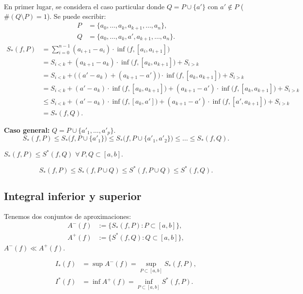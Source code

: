\documentclass[11pt,a4paper]{article}
\begin{document}
\begin{demo}
En primer lugar, se considera el caso particular donde $Q=P\cup\{a'\}$ con $a'\notin P$ ($\#(Q\setminus P)=1$). Se puede escribir:
\begin{align*}
  P&=\{a_0,\dots,a_k,a_{k+1},\dots,a_n\},\\
  Q&=\{a_0,\dots,a_k,a',a_{k+1},\dots,a_n\}.
\end{align*}
\begin{align*}
  S_*(f,P) &= \sum_{i=0}^{n-1}(a_{i+1}-a_i)\cdot\inf\bigl(f,[a_i,a_{i+1}]\bigr)\\
  &= S_{i<k} + (a_{k+1}-a_k)\cdot\inf\bigl(f,[a_k,a_{k+1}]\bigr) + S_{i>k}\\
  &= S_{i<k} + \bigl((a'-a_k)+(a_{k+1}-a')\bigr)\cdot\inf\bigl(f,[a_k,a_{k+1}]\bigr) + S_{i>k}\\
  &= S_{i<k} + (a'-a_k)\cdot\inf\bigl(f,[a_k,a_{k+1}]\bigr) + (a_{k+1}-a')\cdot\inf\bigl(f,[a_k,a_{k+1}]\bigr) + S_{i>k}\\
  &\le S_{i<k} + (a'-a_k)\cdot\inf\bigl(f,[a_k,a']\bigr) + (a_{k+1}-a')\cdot\inf\bigl(f,[a',a_{k+1}]\bigr) + S_{i>k}\\
  &= S_*(f,Q).
\end{align*}

\textbf{Caso general:} $Q=P\cup\{a'_1,\dots,a'_p\}$.
\[
  S_*(f,P)\le S_*\bigl(f,P\cup\{a'_1\}\bigr)\le S_*\bigl(f,P\cup\{a'_1,a'_2\}\bigr)\le\dots\le S_*(f,Q).
\]
\end{demo}

\begin{proposicion}
$S_*(f,P)\le S^*(f,Q)$ \quad $\forall\,P,Q\subset[a,b]$.
\end{proposicion}

\begin{demo}
\[
  S_*(f,P)\le S_*(f,P\cup Q)\le S^*(f,P\cup Q)\le S^*(f,Q).
\]
\end{demo}

\subsection{Integral inferior y superior}

Tenemos dos conjuntos de aproximaciones:
\begin{align*}
  A^-(f) &:= \{S_*(f,P) : P\subset[a,b]\},\\
  A^+(f) &:= \{S^*(f,Q) : Q\subset[a,b]\},
\end{align*}
\qquad $A^-(f)\ll A^+(f)$.

\begin{definicion}
\begin{align*}
  I_*(f) &= \sup A^-(f) = \sup_{P\subset[a,b]} S_*(f,P),\\
  I^*(f) &= \inf A^+(f) = \inf_{P\subset[a,b]} S^*(f,P).
\end{align*}
\end{definicion}
\end{document}
